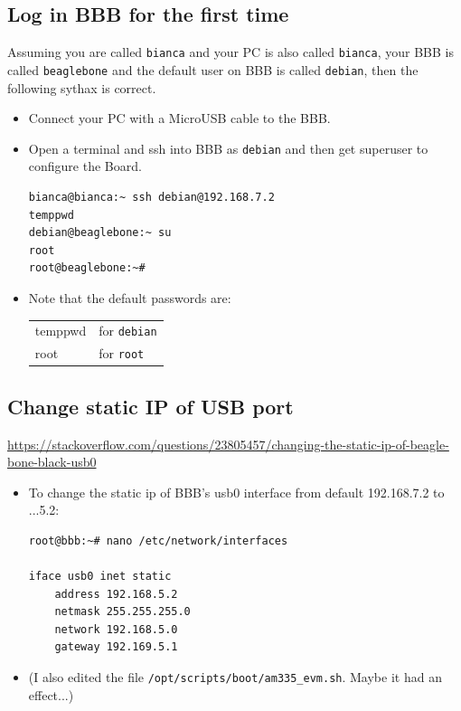 \documentclass[
	fontsize=10pt
	paper=a4
]{scrartcl}
\begin{document}
\subsection{Log in BBB for the first time}

Assuming you are called \texttt{bianca} and your PC is also called \texttt{bianca},
your BBB is called \texttt{beaglebone} and the default user on BBB is called \texttt{debian}, then the following sythax is correct.

\begin{itemize}
\item Connect your PC with a MicroUSB cable to the BBB.

\item Open a terminal and ssh into BBB as \texttt{debian} and then get superuser to configure the Board.
\begin{lstlisting}
bianca@bianca:~ ssh debian@192.168.7.2
temppwd
debian@beaglebone:~ su
root
root@beaglebone:~#
\end{lstlisting}

\item Note that the default passwords are:
\begin{tabular}{l|l}
temppwd & for \texttt{debian} \\
root & for \texttt{root}
\end{tabular}

\end{itemize}



\subsection{Change static IP of USB port}
\url{https://stackoverflow.com/questions/23805457/changing-the-static-ip-of-beagle-bone-black-usb0}

\begin{itemize}
\item To change the static ip of BBB's usb0 interface from default 192.168.7.2 to ...5.2:

\begin{lstlisting}
root@bbb:~# nano /etc/network/interfaces

iface usb0 inet static
	address 192.168.5.2
	netmask 255.255.255.0
	network 192.168.5.0
	gateway 192.169.5.1
\end{lstlisting}


\item (I also edited the file \texttt{/opt/scripts/boot/am335\_evm.sh}. Maybe it had an effect...)

\end{itemize}
\end{document}
